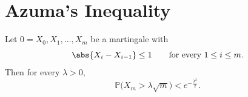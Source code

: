 \section{Azuma's Inequality}\label{sec:azuma}

\begin{theorem}\label{thm:azuma}
    Let \(0 = X_{0}, X_{1}, \ldots, X_{m}\) be a martingale with
    \[
        \abs{X_{i} - X_{i-1}} \le 1 \qquad \text{for every } 1 \le i \le m .
    \]
    Then for every \(\lambda > 0\),
    \[
        \mathbb{P}\bigl( X_{m} > \lambda \sqrt{m} \bigr) < e^{-\frac{\lambda^{2}}{2}} .
    \]
\end{theorem}
